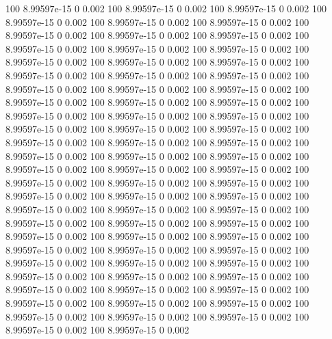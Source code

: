 100  8.99597e-15            0        0.002
100  8.99597e-15            0        0.002
100  8.99597e-15            0        0.002
100  8.99597e-15            0        0.002
100  8.99597e-15            0        0.002
100  8.99597e-15            0        0.002
100  8.99597e-15            0        0.002
100  8.99597e-15            0        0.002
100  8.99597e-15            0        0.002
100  8.99597e-15            0        0.002
100  8.99597e-15            0        0.002
100  8.99597e-15            0        0.002
100  8.99597e-15            0        0.002
100  8.99597e-15            0        0.002
100  8.99597e-15            0        0.002
100  8.99597e-15            0        0.002
100  8.99597e-15            0        0.002
100  8.99597e-15            0        0.002
100  8.99597e-15            0        0.002
100  8.99597e-15            0        0.002
100  8.99597e-15            0        0.002
100  8.99597e-15            0        0.002
100  8.99597e-15            0        0.002
100  8.99597e-15            0        0.002
100  8.99597e-15            0        0.002
100  8.99597e-15            0        0.002
100  8.99597e-15            0        0.002
100  8.99597e-15            0        0.002
100  8.99597e-15            0        0.002
100  8.99597e-15            0        0.002
100  8.99597e-15            0        0.002
100  8.99597e-15            0        0.002
100  8.99597e-15            0        0.002
100  8.99597e-15            0        0.002
100  8.99597e-15            0        0.002
100  8.99597e-15            0        0.002
100  8.99597e-15            0        0.002
100  8.99597e-15            0        0.002
100  8.99597e-15            0        0.002
100  8.99597e-15            0        0.002
100  8.99597e-15            0        0.002
100  8.99597e-15            0        0.002
100  8.99597e-15            0        0.002
100  8.99597e-15            0        0.002
100  8.99597e-15            0        0.002
100  8.99597e-15            0        0.002
100  8.99597e-15            0        0.002
100  8.99597e-15            0        0.002
100  8.99597e-15            0        0.002
100  8.99597e-15            0        0.002
100  8.99597e-15            0        0.002
100  8.99597e-15            0        0.002
100  8.99597e-15            0        0.002
100  8.99597e-15            0        0.002
100  8.99597e-15            0        0.002
100  8.99597e-15            0        0.002
100  8.99597e-15            0        0.002
100  8.99597e-15            0        0.002
100  8.99597e-15            0        0.002
100  8.99597e-15            0        0.002
100  8.99597e-15            0        0.002
100  8.99597e-15            0        0.002
100  8.99597e-15            0        0.002
100  8.99597e-15            0        0.002
100  8.99597e-15            0        0.002
100  8.99597e-15            0        0.002
100  8.99597e-15            0        0.002
100  8.99597e-15            0        0.002
100  8.99597e-15            0        0.002
100  8.99597e-15            0        0.002
100  8.99597e-15            0        0.002
100  8.99597e-15            0        0.002
100  8.99597e-15            0        0.002
100  8.99597e-15            0        0.002
